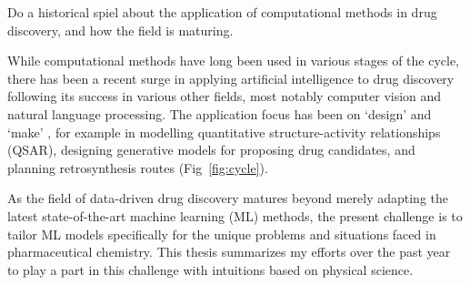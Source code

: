 Do a historical spiel about the application of computational methods in drug discovery, and how the field is maturing.

While computational methods have long been used in various stages of the cycle, there has been a recent surge in applying artificial intelligence to drug discovery following its success in various other fields, most notably computer vision and natural language processing. The application focus has been on `design' and `make' \cite{Coley2019AutonomousProgress}, for example in modelling quantitative structure-activity relationships (QSAR), designing generative models for proposing drug candidates, and planning retrosynthesis routes (Fig~\ref{fig:cycle}). 




As the field of data-driven drug discovery matures beyond merely adapting the latest state-of-the-art machine learning (ML) methods, the present challenge is to tailor ML models specifically for the unique problems and situations faced in pharmaceutical chemistry. This thesis summarizes my efforts over the past year to play a part in this challenge with intuitions based on physical science.

